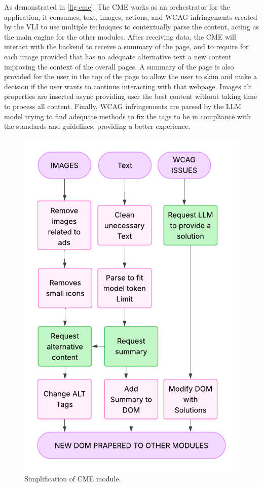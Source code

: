 \documentclass[conference]{IEEEtran}
\begin{document}
As demonstrated in \autoref{fig:cme}. The CME works as an orchestrator for the application, it consumes, text, images, actions, and WCAG infringements created by the VLI to use multiple techniques to contextually parse the content, acting as the main engine for the other modules. After receiving data, the CME will interact with the backend to receive a summary of the page, and to require for each image provided that has no adequate alternative text a new content improving the context of the overall pages. A summary of the page is also provided for the user in the top of the page to allow the user to skim and make a decision if the user wants to continue interacting with that webpage. Images alt properties are inserted async providing user the best content without taking time to process all content. Finally, WCAG infringements are parsed by the LLM model trying to find adequate methods to fix the tags to be in compliance with the standards and guidelines, providing a better experience.

\begin{figure}[h]
\centering
\includegraphics[width=\columnwidth]{images/CME.pdf}
\caption{Simplification of CME module.}
\label{fig:cme}
\end{figure}
\end{document}
